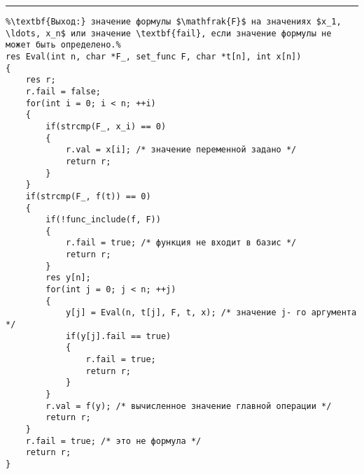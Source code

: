 \documentclass{article}
\begin{document}
\vspace{5pt} \hrule
\begin{lstlisting}[caption={Интерпретация формул - рекурсивная функция Eval}, label=p_112, escapechar=\%]
%\noindent\textbf{Вход:} формула $\mathfrak{F}$, множество F функций базиса, значения переменных $x_1, \ldots, x_n$.\\%
%\textbf{Выход:} значение формулы $\mathfrak{F}$ на значениях $x_1, \ldots, x_n$ или значение \textbf{fail}, если значение формулы не может быть определено.%
res Eval(int n, char *F_, set_func F, char *t[n], int x[n])
{
	res r;
	r.fail = false;
	for(int i = 0; i < n; ++i)
	{
		if(strcmp(F_, x_i) == 0)
		{
			r.val = x[i]; /* значение переменной задано */
			return r;
		}
	}
	if(strcmp(F_, f(t)) == 0)
	{
		if(!func_include(f, F))
		{
			r.fail = true; /* функция не входит в базис */
			return r;
		}
		res y[n];
		for(int j = 0; j < n; ++j)
		{
			y[j] = Eval(n, t[j], F, t, x); /* значение j- го аргумента */
			if(y[j].fail == true)
			{
				r.fail = true;
				return r;
			}
		}
		r.val = f(y); /* вычисленное значение главной операции */
		return r;
	}
	r.fail = true; /* это не формула */
	return r;
}
\end{lstlisting}
\end{document}
